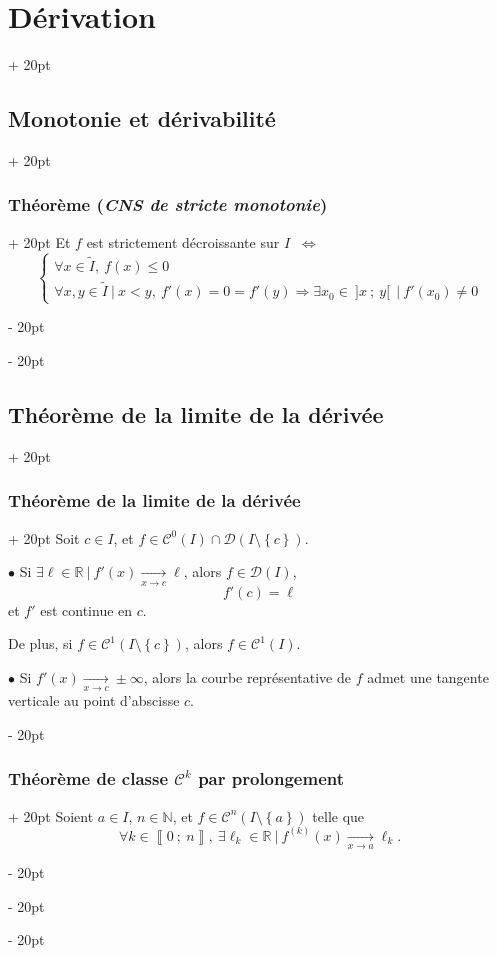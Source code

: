 \documentclass[a4paper, 12pt, twoside]{article}
\newcommand{\N}{\mathbb{N}} %
\newcommand{\R}{\mathbb{R}} %
\newcommand{\nset}[2]{\left\llbracket #1\ ;\ #2 \right\rrbracket}
\newcommand{\tendsto}[1]{\xrightarrow[#1]{}}
\newcommand{\lr}[1]{\left( #1 \right)}
\newcommand{\set}[1]{\left\{ #1 \right\}}
\newcommand{\ssi}{\ \Leftrightarrow \ }
\renewcommand{\le}{\leqslant}
\newcommand{\ind}[1][20pt]{\advance\leftskip + #1}
\newcommand{\deind}[1][20pt]{\advance\leftskip - #1}
\newenvironment{indt}[2][20pt]{#2 \par \ind[#1]}{\par \deind} %
\begin{document}
\begin{indt}{\section{Dérivation}}
\begin{indt}{\subsection{Monotonie et dérivabilité}}
\begin{indt}{\subsubsection{Théorème (\textit{CNS de stricte monotonie})}}
                Et $f$ est strictement décroissante sur $I$ $\ssi$
                \[
                    \begin{cases}
                        \forall x \in \widetilde I,\ f(x) \le 0
                        \\
                        \forall x, y \in \widetilde I\ |\ x < y,\ f'(x) = 0 = f'(y)
                        \Rightarrow \exists x_0 \in\ ]x\ ;\ y[\ \ |\ f'(x_0) \neq 0
                    \end{cases}
                \]
            \end{indt}
        \end{indt}

        \vspace{12pt}
        
        \begin{indt}{\subsection{Théorème de la limite de la dérivée}}
            \begin{indt}{\subsubsection{Théorème de la limite de la dérivée}}
                Soit $c \in I$, et $f \in \mathcal C^0(I) \cap \mathcal D\!\lr{I \setminus \set c}$.

                \vspace{6pt}
                
                $\bullet$ Si $\exists \ell \in \R\ |\ f'(x) \tendsto{x \to c} \ell$, alors $f \in \mathcal D(I)$,
                \[
                    f'(c) = \ell
                \]
                et $f'$ est continue en $c$.

                De plus, si $f \in \mathcal C^1\!\lr{I \setminus \set c}$, alors $f \in \mathcal C^1(I)$.

                \vspace{12pt}
                
                $\bullet$ Si $f'(x) \tendsto{x \to c} \pm \infty$, alors la courbe représentative de $f$ admet une tangente verticale au point d'abscisse $c$.
            \end{indt}

            \vspace{12pt}
            
            \begin{indt}{\subsubsection{Théorème de classe $\mathcal C^k$ par prolongement}}
                Soient $a \in I$, $n \in \N$, et $f \in \mathcal C^n\!\lr{I \setminus \set a}$ telle que
                \[
                    \forall k \in \nset 0 n,\
                    \exists \ell_k \in \R\ |\
                    f^{(k)}(x) \tendsto{x \to a} \ell_k.
                \]


\end{indt}
\end{indt}
\end{indt}
\end{document}
